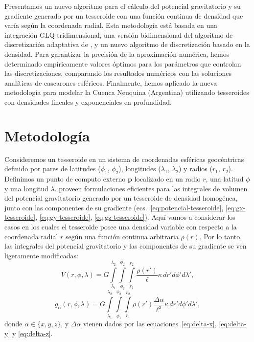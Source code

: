 Presentamos un nuevo algoritmo para el cálculo del potencial gravitatorio y su
gradiente generado por un tesseroide con una función continua de densidad que
varía según la coordenada radial.
Esta metodología está basada en una integración \ac{GLQ} tridimensional, una
versión bidimensional del algoritmo de discretización adaptativa de
\citet{uieda2016} \citep[de acuerdo con~][]{lin2019}, y un nuevo algoritmo
de discretización basado en la densidad.
Para garantizar la precisión de la aproximación numérica, hemos determinado
empíricamente valores óptimos para los parámetros que controlan las
discretizaciones, comparando los resultados numéricos con las soluciones
analíticas de cascarones esféricos.
Finalmente, hemos aplicado la nueva metodología para modelar la Cuenca
Neuquina (Argentina) utilizando tesseroides con densidades lineales
y exponenciales en profundidad.


\section{Metodología}

Consideremos un tesseroide en un sistema de coordenadas esféricas geocéntricas
definido por pares de latitudes ($\phi_1$, $\phi_2$), longitudes ($\lambda_1$,
$\lambda_2$) y radios ($r_1$, $r_2$).
Definimos un punto de computo externo $\mathbf{p}$ localizado en un radio $r$,
una latitud $\phi$ y una longitud $\lambda$.
\citet{grombein2013} proveen formulaciones eficientes para las integrales de
volumen del potencial gravitatorio generado por un tesseroide de densidad
homogénea, junto con las componentes de su gradiente
(ecs.~\ref{eq:potencial-tesseroide}, \ref{eq:gx-tesseroide},
\ref{eq:gy-tesseroide}, \ref{eq:gz-tesseroide}).
Aquí vamos a considerar los casos en los cuales el tesseroide posee una
densidad variable con respecto a la coordenada radial $r$ según una función
continua arbitraria $\rho(r)$.
Por lo tanto, las integrales del potencial gravitatorio y las componentes de su
gradiente se ven ligeramente modificadas:
%
\begin{equation}
    V(r,\phi,\lambda) = G
    \int\limits_{\lambda_1}^{\lambda_2}
    \int\limits_{\phi_1}^{\phi_2}
    \int\limits_{r_1}^{r_2}
    \frac{\rho(r')}{\ell} \kappa \,  dr' d\phi' d\lambda',
\label{eq:tesseroid-pot}
\end{equation}
%
\begin{equation}
    g_{\alpha}(r,\phi,\lambda) = G
    \int\limits_{\lambda_1}^{\lambda_2}
    \int\limits_{\phi_1}^{\phi_2}
    \int\limits_{r_1}^{r_2}
    \rho(r') \frac{\Delta\alpha}{\ell^3}
    \kappa \, dr' d\phi' d\lambda',
\label{eq:tesseroid-grav}
\end{equation}
%
donde $\alpha \in \{x, y, z\}$, y $\Delta \alpha$ vienen dados por
las ecuaciones~\ref{eq:delta-x}, \ref{eq:delta-y} y \ref{eq:delta-z}.

